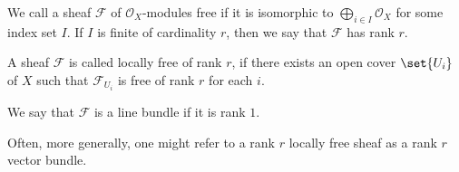 We call a sheaf $\mathcal{F}$ of $\mathcal{O}_X$-modules free if it is isomorphic to
$\bigoplus_{i \in I}\mathcal{O}_X$ for some index set $I$. If $I$ is finite of
cardinality $r$, then we say that $\mathcal{F}$ has rank $r$.

A sheaf $\mathcal{F}$ is called locally free of rank $r$, if there exists an
open cover $\set{U_i}$ of $X$ such that $\mathcal{F}_{U_i}$ is free of rank $r$
for each $i$.

We say that $\mathcal{F}$ is a line bundle if it is rank $1$.

Often, more generally, one might refer to a rank $r$ locally free sheaf as a
rank $r$ vector bundle.
